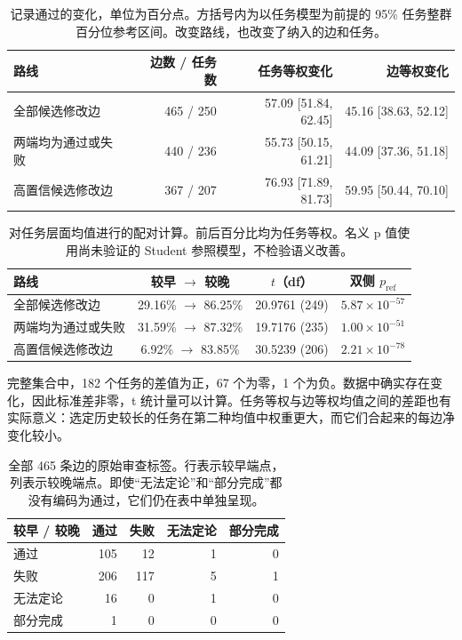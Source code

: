 \begin{table}[htbp]
\centering\small
\caption{记录通过的变化，单位为百分点。方括号内为以任务模型为前提的 95\% 任务整群百分位参考区间。改变路线，也改变了纳入的边和任务。}
\label{tab:paired-effects}
\begin{tabularx}{\linewidth}{Y r r r}
\toprule
路线 & 边数 / 任务数 & 任务等权变化 & 边等权变化 \\
\midrule
全部候选修改边 & 465 / 250 & 57.09 [51.84, 62.45] & 45.16 [38.63, 52.12] \\
两端均为通过或失败 & 440 / 236 & 55.73 [50.15, 61.21] & 44.09 [37.36, 51.18] \\
高置信候选修改边 & 367 / 207 & 76.93 [71.89, 81.73] & 59.95 [50.44, 70.10] \\
\bottomrule
\end{tabularx}
\end{table}

\begin{table}[htbp]
\centering\small
\caption{对任务层面均值进行的配对计算。前后百分比均为任务等权。名义 p 值使用尚未验证的 Student 参照模型，不检验语义改善。}
\label{tab:paired-tests}
\begin{tabularx}{\linewidth}{Y c c c}
\toprule
路线 & 较早 $\to$ 较晚 & $t$（df） & 双侧 $p_{\mathrm{ref}}$ \\
\midrule
全部候选修改边 & 29.16\% $\to$ 86.25\% & 20.9761 (249) & $5.87\times10^{-57}$ \\
两端均为通过或失败 & 31.59\% $\to$ 87.32\% & 19.7176 (235) & $1.00\times10^{-51}$ \\
高置信候选修改边 & 6.92\% $\to$ 83.85\% & 30.5239 (206) & $2.21\times10^{-78}$ \\
\bottomrule
\end{tabularx}
\end{table}

完整集合中，182 个任务的差值为正，67 个为零，1 个为负。数据中确实存在变化，因此标准差非零，t 统计量可以计算。任务等权与边等权均值之间的差距也有实际意义：选定历史较长的任务在第二种均值中权重更大，而它们合起来的每边净变化较小。

\begin{table}[htbp]
\centering\small
\caption{全部 465 条边的原始审查标签。行表示较早端点，列表示较晚端点。即使“无法定论”和“部分完成”都没有编码为通过，它们仍在表中单独呈现。}
\label{tab:labels}
\begin{tabular}{lrrrr}
\toprule
较早 / 较晚 & 通过 & 失败 & 无法定论 & 部分完成 \\
\midrule
通过 & 105 & 12 & 1 & 0 \\
失败 & 206 & 117 & 5 & 1 \\
无法定论 & 16 & 0 & 1 & 0 \\
部分完成 & 1 & 0 & 0 & 0 \\
\bottomrule
\end{tabular}
\end{table}

